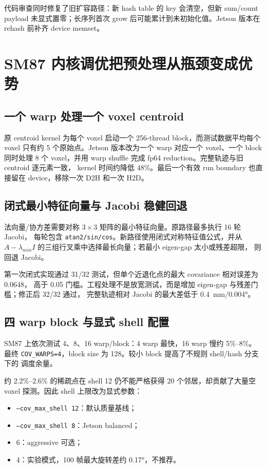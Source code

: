 \documentclass[UTF8,a4paper,11pt,fontset=none]{ctexart}
\begin{document}
代码审查同时修复了旧扩容路径：新 hash table 的 key 会清空，但新 sum/count payload
未显式置零；长序列首次 grow 后可能累计到未初始化值。Jetson 版本在 rehash 前补齐 device memset。

\section{SM87 内核调优把预处理从瓶颈变成优势}

\subsection{一个 warp 处理一个 voxel centroid}

原 centroid kernel 为每个 voxel 启动一个 256-thread block，而测试数据平均每个 voxel
只有约 5 个原始点。Jetson 版本改为一个 warp 对应一个 voxel、一个 block 同时处理 8 个
voxel，并用 warp shuffle 完成 fp64 reduction。完整轨迹与旧 centroid 逐元素一致，
kernel 时间约降低 48\%。最后一个有效 run boundary 也直接留在 device，移除一次 D2H
和一次 H2D。

\subsection{闭式最小特征向量与 Jacobi 稳健回退}

法向量/协方差需要对称 $3\times3$ 矩阵的最小特征向量。原路径最多执行 16 轮 Jacobi，
每轮包含 \texttt{atan2/sin/cos}。新路径使用闭式对称特征值公式，并从
$A-\lambda_{min}I$ 的三组行叉乘中选择最长向量；若最小 eigen-gap 太小或残差超限，
则回退 Jacobi。

第一次闭式实现通过 31/32 测试，但单个近退化点的最大 covariance 相对误差为 0.0648，
高于 0.05 门槛。工程处理不是放宽测试，而是增加 eigen-gap 与残差门槛；修正后 32/32 通过，
完整轨迹相对 Jacobi 的最大差低于 \SI{0.4}{\milli\metre}/\ang{0.004}。

\subsection{四 warp block 与显式 shell 配置}

SM87 上依次测试 4、8、16 warp/block：4 warp 最快，16 warp 慢约 5\%--8\%。最终
\texttt{COV\_WARPS=4}，block size 为 128。较小 block 提高了不规则 shell/hash 分支下的
调度余量。

约 2.2\%--2.6\% 的稀疏点在 shell 12 仍不能严格获得 20 个邻居，却贡献了大量空 voxel
探测。因此 shell 上限改为显式参数：

\begin{itemize}
  \item \texttt{--cov\_max\_shell 12}：默认质量基线；
  \item \texttt{--cov\_max\_shell 8}：Jetson balanced；
  \item 6：aggressive 可选；
  \item 4：实验模式，100 帧最大旋转差约 \ang{0.17}，不推荐。
\end{itemize}
\end{document}
